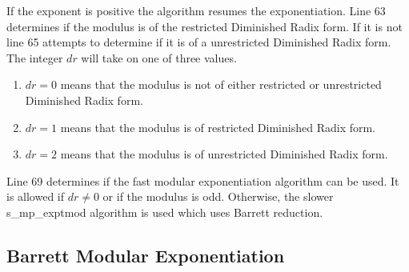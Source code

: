 \documentclass[b5paper]{book}
\begin{document}
If the exponent is positive the algorithm resumes the exponentiation.  Line 63 determines if the modulus is of the restricted Diminished Radix 
form.  If it is not line 65 attempts to determine if it is of a unrestricted Diminished Radix form.  The integer $dr$ will take on one
of three values.

\begin{enumerate}
\item $dr = 0$ means that the modulus is not of either restricted or unrestricted Diminished Radix form.
\item $dr = 1$ means that the modulus is of restricted Diminished Radix form.
\item $dr = 2$ means that the modulus is of unrestricted Diminished Radix form.
\end{enumerate}

Line 69 determines if the fast modular exponentiation algorithm can be used.  It is allowed if $dr \ne 0$ or if the modulus is odd.  Otherwise,
the slower s\_mp\_exptmod algorithm is used which uses Barrett reduction.  

\subsection{Barrett Modular Exponentiation}
\end{document}
